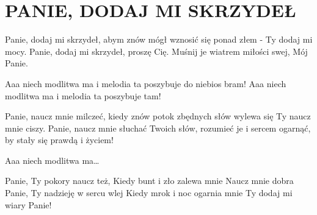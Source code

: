 \documentclass[../../../songbook.tex]{subfiles}
\begin{document}
\TabPositions{8cm} %
\section*{PANIE, DODAJ MI SKRZYDEŁ}
{}
\vspace{0.5cm}
Panie, dodaj mi skrzydeł, abym znów			 \newline
mógł wznosić się ponad złem - Ty dodaj mi mocy.	 \newline
Panie, dodaj mi skrzydeł, proszę Cię.			 \newline
Muśnij je wiatrem miłości swej, Mój Panie.		 \newline

\-\hspace{1cm} Aaa niech modlitwa ma				 \newline	
\-\hspace{1cm} i melodia ta poszybuje do niebios bram!		 \newline
\-\hspace{1cm} Aaa niech modlitwa ma 				 \newline
\-\hspace{1cm} i melodia ta poszybuje tam!				 \newline

Panie, naucz mnie milczeć, kiedy znów				\newline
potok zbędnych słów wylewa się						\newline
Ty naucz mnie ciszy.								\newline
Panie, naucz mnie słuchać Twoich słów,				\newline
rozumieć je i sercem ogarnąć, by stały się prawdą i życiem!	\newline

\-\hspace{1cm} Aaa niech modlitwa ma…	\newline

Panie, Ty pokory naucz też,		\newline
Kiedy bunt i zło zalewa mnie	\newline
Naucz mnie dobra				\newline
Panie, Ty nadzieję w sercu wlej	\newline
Kiedy mrok i noc ogarnia mnie	\newline
Ty dodaj mi wiary Panie!		\newline
\end{document}
